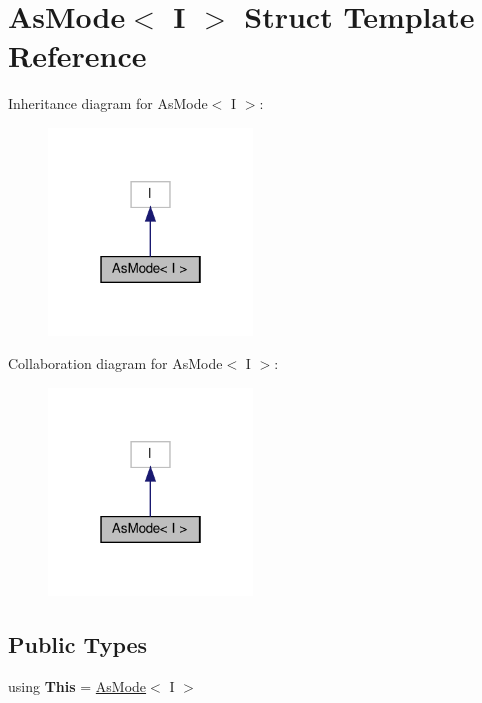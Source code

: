 \hypertarget{structAsMode}{}\section{As\+Mode$<$ I $>$ Struct Template Reference}
\label{structAsMode}


Inheritance diagram for As\+Mode$<$ I $>$\+:
\nopagebreak
\begin{figure}[H]
\begin{center}
\leavevmode
\includegraphics[width=154pt]{structAsMode__inherit__graph}
\end{center}
\end{figure}


Collaboration diagram for As\+Mode$<$ I $>$\+:
\nopagebreak
\begin{figure}[H]
\begin{center}
\leavevmode
\includegraphics[width=154pt]{structAsMode__coll__graph}
\end{center}
\end{figure}
\subsection*{Public Types}
\begin{DoxyCompactItemize}
\item 
\mbox{\label{structAsMode_a40b38b801c92c71f62669fd54a733fc1}} 
using {\bfseries This} = \hyperlink{structAsMode}{As\+Mode}$<$ I $>$
\end{DoxyCompactItemize}
